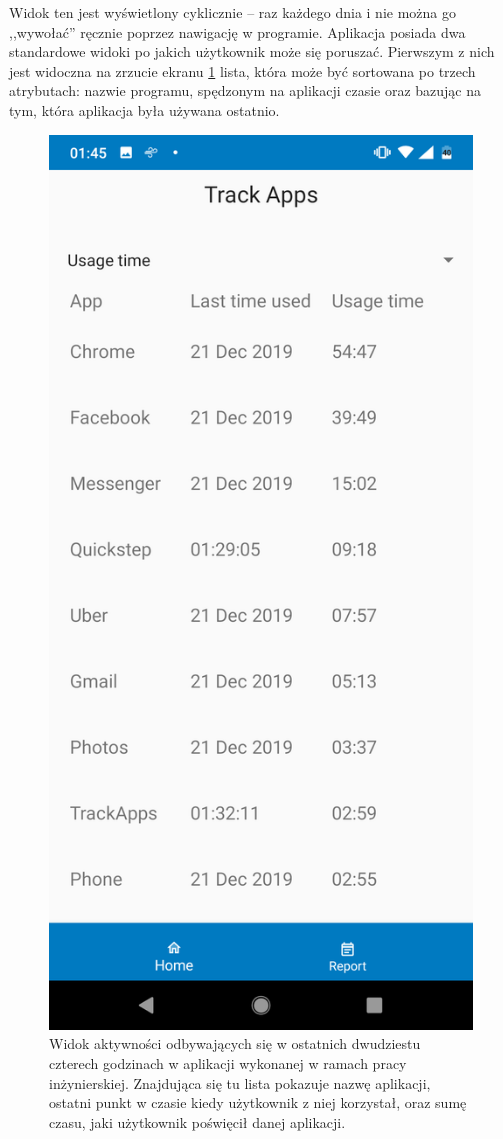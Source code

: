 \documentclass[a4paper,twoside,12pt]{book}
\begin{document}
Widok ten jest wyświetlony cyklicznie -- raz każdego dnia i nie można go ,,wywołać'' ręcznie poprzez nawigację w programie. Aplikacja posiada dwa standardowe widoki po jakich użytkownik może się poruszać. Pierwszym z nich jest widoczna na zrzucie ekranu \ref{fig:activites_history} lista, która może być sortowana po trzech atrybutach: nazwie programu, spędzonym na aplikacji czasie oraz bazując na tym, która aplikacja była używana ostatnio. 
\begin{figure}[h!]
    \centering
    \includegraphics[scale=0.2]{images/activites_history.png}
    \caption{Widok aktywności odbywających się w ostatnich dwudziestu czterech godzinach w aplikacji wykonanej w ramach pracy inżynierskiej. Znajdująca się tu lista pokazuje nazwę aplikacji, ostatni punkt w czasie kiedy użytkownik z niej korzystał, oraz sumę czasu, jaki użytkownik poświęcił danej aplikacji.}
    \label{fig:activites_history}
\end{figure}
\end{document}
